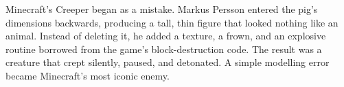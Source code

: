 Minecraft’s Creeper began as a mistake. Markus Persson entered the pig’s dimensions backwards, producing a tall, thin figure that looked nothing like an animal. Instead of deleting it, he added a texture, a frown, and an explosive routine borrowed from the game’s block-destruction code. The result was a creature that crept silently, paused, and detonated. A simple modelling error became Minecraft’s most iconic enemy.